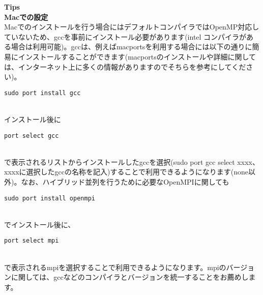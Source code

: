 \begin{screen}
\Large 
{\bf Tips}
\normalsize
\\
{\bf Macでの設定}
\\
Macでのインストールを行う場合にはデフォルトコンパイラではOpenMP対応していないため、gccを事前にインストール必要があります(intel コンパイラがある場合は利用可能)。gccは、例えばmacportsを利用する場合には以下の通りに簡易にインストールすることができます(macportsのインストールや詳細に関しては、インターネット上に多くの情報がありますのでそちらを参考にしてください)。\\
\begin{minipage}{10cm}
\begin{screen}
\begin{verbatim}
sudo port install gcc
\end{verbatim}
\end{screen}
\end{minipage}
\\インストール後に\\
\begin{minipage}{10cm}
\begin{screen}
\begin{verbatim}
port select gcc
\end{verbatim}
\end{screen}
\end{minipage}
\\で表示されるリストからインストールしたgccを選択(sudo port gcc select xxxx、xxxxに選択したgccの名称を記入)することで利用できるようになります(none以外)。なお、ハイブリッド並列を行うために必要なOpenMPIに関しても\\
\begin{minipage}{10cm}
\begin{screen}
\begin{verbatim}
sudo port install openmpi
\end{verbatim}
\end{screen}
\end{minipage}
\\でインストール後に、\\
\begin{minipage}{10cm}
\begin{screen}
\begin{verbatim}
port select mpi
\end{verbatim}
\end{screen}
\end{minipage}
\\で表示されるmpiを選択することで利用できるようになります。mpiのバージョンに関しては、gccなどのコンパイラとバージョンを統一することをお薦めします。
\end{screen}
